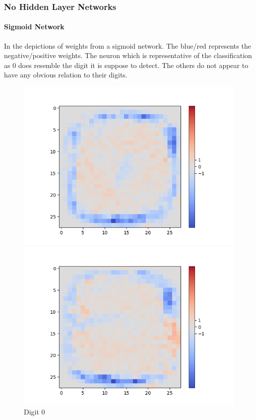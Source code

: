 \subsubsection{No Hidden Layer Networks}

\paragraph{Sigmoid Network}
In the depictions of weights from a sigmoid network. The blue/red represents the negative/positive weights. The neuron which is representative of the classification as 0 does resemble the digit it is suppose to detect. The others do not appear to have any obvious relation to their digits.

\begin{figure}[H]
	\captionsetup{labelformat=empty}
	\centering
	\begin{minipage}[b]{0.19\textwidth}
		\includegraphics[width=\textwidth]{Sigmoid(NO-Hidden)/Layer0-Neuron-0.png}
		\caption{Digit 0}
	\end{minipage}
	\begin{minipage}[b]{0.19\textwidth}
		\includegraphics[width=\textwidth]{Sigmoid(NO-Hidden)/Layer0-Neuron-2.png}

\end{minipage}
\end{figure}
